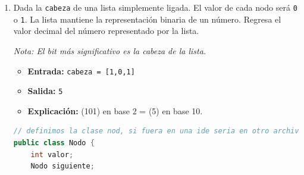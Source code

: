 \documentclass{article}
\begin{document}
\begin{enumerate}
   \begin{lstlisting} [language=Java]
   public class Main {
    public int encuentraEntero(int[] arr) {
        int n = arr.length;
        int frecuencia = n / 4; // El 25% de n

        // Recorremos el arreglo y mantenemos un registro del numero con mayor frecuencia.
        int actual = arr[0];
        int conteo = 1;
    //Recorremos el arreglo a partir del segundo elemento (i = 1) y comparamos cada elemento con el valor actual.
    
        for (int i = 1; i < n; i++) {
            if (arr[i] == actual) {
                conteo++;
                if (conteo > frecuencia) {
                    return actual;
                }
            } else {
                actual = arr[i];
                conteo = 1;
            }
        }

        return actual;
    }
    //Si el elemento es igual al valor actual, incrementamos el contador conteo. Si el contador supera la frecuencia, significa que hemos encontrado el num que buscamos y lo devolvemos como resultado

    public static void main(String[] args) {
        Main main = new Main();
        //Creamos una instancia de la clase Main llamada main.
        int[] arr1 = {1, 2, 2, 6, 6, 6, 6, 7, 10};
        int resultado1 = main.encuentraEntero(arr1);
        System.out.println("Entrada: arr = [1, 2, 2, 6, 6, 6, 6, 7, 10]");
        System.out.println("Salida: " + resultado1); // imprime 6

        //Definimos dos arreglos de entrada (arr1 y arr2).
        //Llamamos al metodo encuentraEntero en la instancia main para encontrar el num en cada uno de ellos
          
        int[] arr2 = {1, 1};
        int resultado2 = main.encuentraEntero(arr2);
        System.out.println("Entrada: arr = [1, 1]");
        System.out.println("Salida: " + resultado2); // imprime 1
    }
}


   \end{lstlisting}

    \item Dada la \texttt{cabeza} de una lista simplemente ligada. El valor de
    cada nodo será \texttt{0} o \texttt{1}. La lista mantiene la representación
    binaria de un número. Regresa el valor decimal del número representado por
    la lista.

    \textit{Nota: El bit más significativo es la cabeza de la lista.}
    \begin{itemize}
        \item \textbf{Entrada:} \texttt{cabeza = [1,0,1]}
        \item \textbf{Salida:} \texttt{5}
        \item \textbf{Explicación:} (101) en base 2 = (5) en base 10.
    \end{itemize}
    \begin{lstlisting}[language=Java]
        // definimos la clase nod, si fuera en una ide seria en otro archivo, esto para representar un nodo
public class Nodo {
    int valor;
    Nodo siguiente;


\end{lstlisting}
\end{enumerate}
\end{document}
